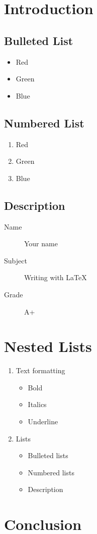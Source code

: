 \documentclass{article}
\title{}
\author{Javad M Alizadeh}
\date{}
\begin{document}
	\maketitle
	
\section{Introduction}


\subsection{Bulleted List}

\begin{itemize}
	\item Red
	\item Green
	\item Blue
\end{itemize}	

\subsection{Numbered List}

\begin{enumerate}
	\item Red
	\item Green
	\item Blue
\end{enumerate}	

\subsection{Description}

\begin{description}
	\item[Name] Your name
	\item[Subject] Writing with \LaTeX
	\item[Grade] A+
\end{description}

\section{Nested Lists}

\begin{enumerate}
	\item Text formatting
	\begin{itemize}
		\item Bold
		\item Italics
		\item Underline
	\end{itemize}
	\item Lists
	\begin{itemize}
		\item Bulleted lists
		\item Numbered lists
		\item Description
	\end{itemize}
\end{enumerate}

	
\section{Conclusion}
	
	
\end{document}
